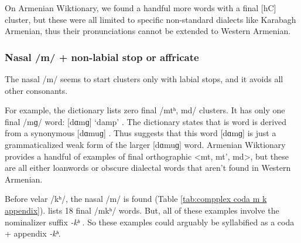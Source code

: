 	\begin{table}[H]
		\centering
		\caption{Final CC clusters    where C1 is fricative /h/}
		\label{tab:compplex coda  hC}
	\end{table}
	
	On Armenian Wiktionary, we found a handful more words with a final [hC] cluster, but these were all limited to specific non-standard dialects like Karabagh Armenian, thus their pronunciations cannot be extended to Western Armenian. 
	\subsubsection{Nasal /m/ + non-labial stop or affricate}\label{section:syllable:Final2C:FallingOther:NasalMstop}
	The nasal /m/ seems to   start clusters only with labial stops, and it avoids all other consonants.  
	
	For example, the \citeauthor{kouyoumdjian-1970-DictionaryArmenianEnglish} dictionary lists zero final /mtʰ, md/ clusters. It has only one final /mɡ/ word: [dɑmɡ] `damp' . The dictionary states that is word is derived from a synonymous [dɑmuɡ] . Thus suggests that this word [dɑmɡ] is just a grammaticalized weak form of the larger [dɑmuɡ] word. Armenian Wiktionary provides a handful of examples of final orthographic <mt, mt', md>,   but these are all either loanwords or obscure dialectal words that aren't found in   Western Armenian. 
	
	
	Before velar /kʰ/, the nasal /m/ is found (Table \ref{tab:compplex coda  m k appendix}). \citeauthor{kouyoumdjian-1970-DictionaryArmenianEnglish} lists 18 final /mkʰ/ words. But, all of these examples involve the nominalizer suffix \textit{-kʰ} . So these examples could arguably be syllabified as a coda + appendix \textit{-kʰ}. 
	
